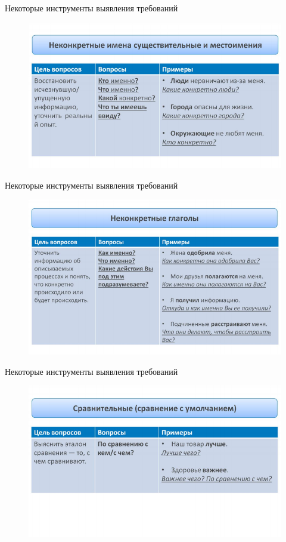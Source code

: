 \documentclass{beamer}
\begin{document}
\begin{frame}[t]{Некоторые инструменты выявления требований}
\begin{figure}[h]
\centering
\includegraphics[scale=0.5]{images/lec02-pic16.png}
\end{figure}
\end{frame}

\begin{frame}[t]{Некоторые инструменты выявления требований}
\begin{figure}[h]
\centering
\includegraphics[scale=0.5]{images/lec02-pic17.png}
\end{figure}
\end{frame}

\begin{frame}[t]{Некоторые инструменты выявления требований}
\begin{figure}[h]
\centering
\includegraphics[scale=0.5]{images/lec02-pic18.png}
\end{figure}
\end{frame}
\end{document}
